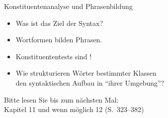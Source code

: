 \begin{frame}
  {Konstituentenanalyse und Phrasenbildung}
  \pause
  \begin{itemize}[<+->]
    \item Was ist das Ziel der Syntax?
    \item Wortformen bilden \alert{Phrasen}.
    \item Konstituententests sind !
    \item Wie strukturieren Wörter bestimmter Klassen\\
      den syntaktischen Aufbau in "`ihrer Umgebung"'?
  \end{itemize}
  \pause
  \Zeile
  \begin{center}
    Bitte lesen Sie bis zum nächsten Mal:\\
    \alert{Kapitel 11 und wenn möglich 12 (S.~323--382)}
  \end{center}
\end{frame}

